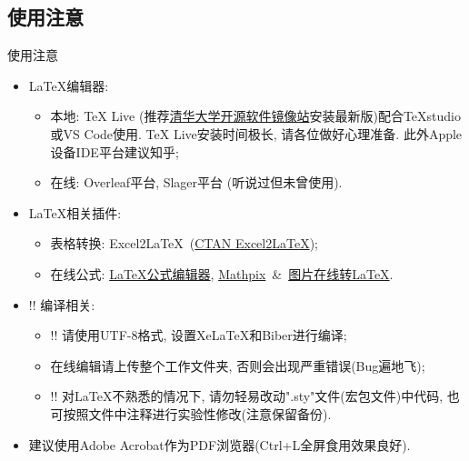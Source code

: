 \documentclass[hyperref,UTF8,11pt]{beamer}
\begin{document}
\subsection{使用注意}
\begin{frame}{使用注意}
	\begin{itemize}
		\item<1-> \LaTeX 编辑器:
		\begin{itemize}
			\item<1-> 本地: TeX Live (推荐\href{https://mirrors.tuna.tsinghua.edu.cn/CTAN/systems/texlive/Images/}{\color{BSblue}清华大学开源软件镜像站}安装最新版)配合TeXstudio或VS Code使用. TeX Live安装时间极长, 请各位做好心理准备. 此外Apple设备IDE平台建议知乎;
			\item<1-> 在线: Overleaf平台, Slager平台 (听说过但未曾使用).
		\end{itemize}
		\item<2-> \LaTeX 相关插件:
		\begin{itemize}
			\item<2-> 表格转换: Excel2\LaTeX~(\href{https://www.ctan.org/tex-archive/support/excel2latex/}{\color{BSblue}CTAN Excel2\LaTeX});
			\item<2-> 在线公式: \href{https://www.latexlive.com/}{\color{BSblue}LaTeX公式编辑器}, \href{https://mathpix.com/}{\color{BSblue}
				Mathpix}~\&~\href{https://mathf.itewqq.cn/}{\color{BSblue}图片在线转LaTeX}.
		\end{itemize}
		\item<3-> \color{JXred}!! 编译相关:
		\begin{itemize}
			\item<3-> \color{JXred}!! 请使用UTF-8格式, 设置XeLaTeX和Biber进行编译;
			\item<3-> 在线编辑请上传整个工作文件夹, 否则会出现严重错误(Bug遍地飞);
			\item<3-> \color{JXred}!! 对\LaTeX 不熟悉的情况下, 请勿轻易改动".sty"文件(宏包文件)中代码, 也可按照文件中注释进行实验性修改(注意保留备份).
		\end{itemize}
		\item<4-> \color{JXred} 建议使用Adobe Acrobat作为PDF浏览器(Ctrl+L全屏食用效果良好).
	\end{itemize}
\end{frame}
\end{document}
